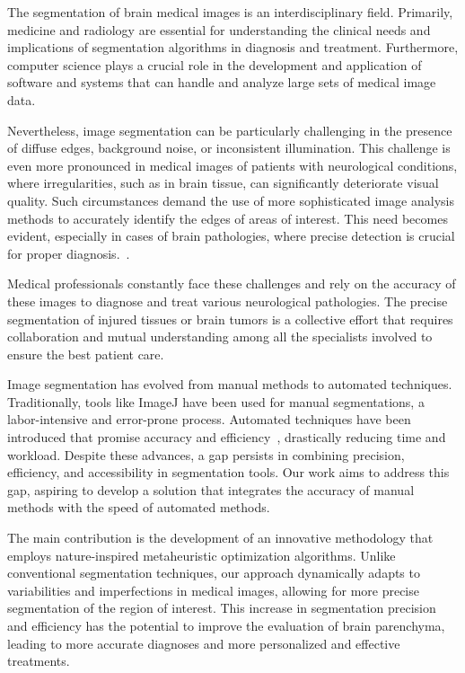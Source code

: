 \documentclass{elsarticle}
\begin{document}
\noindent The segmentation of brain medical images is an interdisciplinary field. Primarily, medicine and radiology are essential for understanding the clinical needs and implications of segmentation algorithms in diagnosis and treatment. Furthermore, computer science plays a crucial role in the development and application of software and systems that can handle and analyze large sets of medical image data.

\noindent Nevertheless, image segmentation can be particularly challenging in the presence of diffuse edges, background noise, or inconsistent illumination. This challenge is even more pronounced in medical images of patients with neurological conditions, where irregularities, such as in brain tissue, can significantly deteriorate visual quality. Such circumstances demand the use of more sophisticated image analysis methods to accurately identify the edges of areas of interest. This need becomes evident, especially in cases of brain pathologies, where precise detection is crucial for proper diagnosis.~\cite{segmentation_bandyopadhyay_2021,KaushikPancholi2023}.

\noindent Medical professionals constantly face these challenges and rely on the accuracy of these images to diagnose and treat various neurological pathologies. The precise segmentation of injured tissues or brain tumors is a collective effort that requires collaboration and mutual understanding among all the specialists involved to ensure the best patient care.

\noindent Image segmentation has evolved from manual methods to automated techniques. Traditionally, tools like ImageJ have been used for manual segmentations, a labor-intensive and error-prone process. Automated techniques have been introduced that promise accuracy and efficiency~\cite{Liu2024,Ilesanmi2024}, drastically reducing time and workload. Despite these advances, a gap persists in combining precision, efficiency, and accessibility in segmentation tools. Our work aims to address this gap, aspiring to develop a solution that integrates the accuracy of manual methods with the speed of automated methods.

\noindent The main contribution is the development of an innovative methodology that employs nature-inspired metaheuristic optimization algorithms. Unlike conventional segmentation techniques, our approach dynamically adapts to variabilities and imperfections in medical images, allowing for more precise segmentation of the region of interest. This increase in segmentation precision and efficiency has the potential to improve the evaluation of brain parenchyma, leading to more accurate diagnoses and more personalized and effective treatments.
\end{document}
